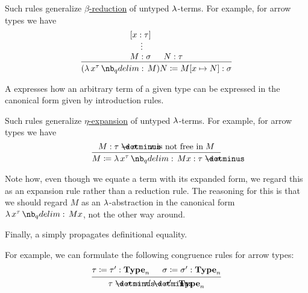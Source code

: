 \begin{remark}
\begin{thmenum}
\begin{thmenum}
      Such rules generalize \hyperref[def:beta_eta_reduction]{\( \beta \)-reduction} of untyped \( \mathrm{\lambda} \)-terms. For example, for arrow types we have
      \begin{equation*}
        \begin{prooftree}
          \hypo{ [x: \tau] }
          \ellipsis {} { M: \sigma }

          \hypo{ N: \tau }
          \infer2{ (\qabs {x^\tau} M) N \coloneqq M[x \mapsto N]: \sigma }.
        \end{prooftree}
      \end{equation*}

       A  expresses how an arbitrary term of a given type can be expressed in the canonical form given by introduction rules.

      Such rules generalize \hyperref[def:beta_eta_reduction]{\( \eta \)-expansion} of untyped \( \mathrm{\lambda} \)-terms. For example, for arrow types we have
      \begin{equation*}
        \begin{prooftree}
          \hypo{ M: \tau \synimplies \sigma }
          \hypo{ x \T{is not free in} M }
          \infer2{ M \coloneqq \qabs {x^\tau} M x: \tau \synimplies \sigma }.
        \end{prooftree}
      \end{equation*}

      Note how, even though we equate a term with its expanded form, we regard this as an expansion rule rather than a reduction rule. The reasoning for this is that we should regard \( M \) as an \( \mathrm{\lambda} \)-abstraction in the canonical form \( \qabs {x^\tau} M x \), not the other way around.

       Finally, a  simply propagates definitional equality.

      For example, we can formulate the following congruence rules for arrow types:
      \begin{equation*}
        \begin{prooftree}
          \hypo{ \tau \coloneqq \tau': \op*{Type}_n }
          \hypo{ \sigma \coloneqq \sigma': \op*{Type}_n }
          \infer2{ \tau \synimplies \sigma \coloneqq \tau' \synimplies \sigma': \op*{Type}_n }
        \end{prooftree}
      \end{equation*}


\end{thmenum}
\end{thmenum}
\end{remark}
